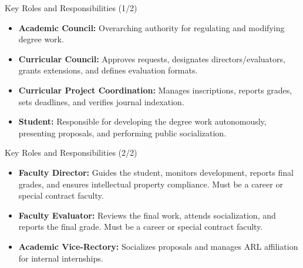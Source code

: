         \begin{frame}{Key Roles and Responsibilities (1/2)}
          \begin{itemize}
            \item<1-> \textbf{Academic Council:} Overarching authority for regulating and modifying degree work.
            \item<2-> \textbf{Curricular Council:} Approves requests, designates directors/evaluators, grants extensions, and defines evaluation formats.
            \item<3-> \textbf{Curricular Project Coordination:} Manages inscriptions, reports grades, sets deadlines, and verifies journal indexation.
            \item<4-> \textbf{Student:} Responsible for developing the degree work autonomously, presenting proposals, and performing public socialization.
          \end{itemize}
        \end{frame}

        \begin{frame}{Key Roles and Responsibilities (2/2)}
          \begin{itemize}
            \item<1-> \textbf{Faculty Director:} Guides the student, monitors development, reports final grades, and ensures intellectual property compliance. Must be a career or special contract faculty.
            \item<2-> \textbf{Faculty Evaluator:} Reviews the final work, attends socialization, and reports the final grade. Must be a career or special contract faculty.
            \item<3-> \textbf{Academic Vice-Rectory:} Socializes proposals and manages ARL affiliation for internal internships.
          \end{itemize}
        \end{frame}


